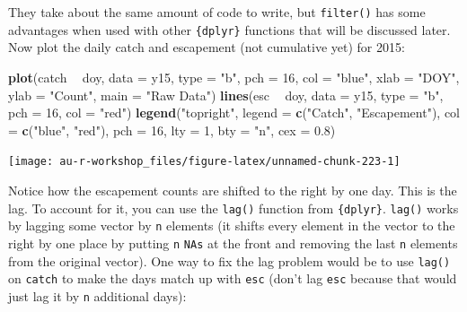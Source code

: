 \documentclass[]{book}
\newenvironment{Shaded}{\begin{snugshade}}{\end{snugshade}}
\newcommand{\KeywordTok}[1]{\textcolor[rgb]{0.13,0.29,0.53}{\textbf{#1}}}
\newcommand{\DataTypeTok}[1]{\textcolor[rgb]{0.13,0.29,0.53}{#1}}
\newcommand{\DecValTok}[1]{\textcolor[rgb]{0.00,0.00,0.81}{#1}}
\newcommand{\FloatTok}[1]{\textcolor[rgb]{0.00,0.00,0.81}{#1}}
\newcommand{\StringTok}[1]{\textcolor[rgb]{0.31,0.60,0.02}{#1}}
\newcommand{\OperatorTok}[1]{\textcolor[rgb]{0.81,0.36,0.00}{\textbf{#1}}}
\newcommand{\NormalTok}[1]{#1}
\theoremstyle{definition}
\theoremstyle{definition}
\theoremstyle{definition}
\theoremstyle{remark}
\begin{document}
They take about the same amount of code to write, but \texttt{filter()}
has some advantages when used with other \texttt{\{dplyr\}} functions
that will be discussed later. Now plot the daily catch and escapement
(not cumulative yet) for 2015:

\begin{Shaded}
\begin{Highlighting}[]
\KeywordTok{plot}\NormalTok{(catch }\OperatorTok{~}\StringTok{ }\NormalTok{doy, }\DataTypeTok{data =}\NormalTok{ y15, }\DataTypeTok{type =} \StringTok{"b"}\NormalTok{, }\DataTypeTok{pch =} \DecValTok{16}\NormalTok{, }\DataTypeTok{col =} \StringTok{"blue"}\NormalTok{,}
     \DataTypeTok{xlab =} \StringTok{"DOY"}\NormalTok{, }\DataTypeTok{ylab =} \StringTok{"Count"}\NormalTok{, }\DataTypeTok{main =} \StringTok{"Raw Data"}\NormalTok{)}
\KeywordTok{lines}\NormalTok{(esc }\OperatorTok{~}\StringTok{ }\NormalTok{doy, }\DataTypeTok{data =}\NormalTok{ y15, }\DataTypeTok{type =} \StringTok{"b"}\NormalTok{, }\DataTypeTok{pch =} \DecValTok{16}\NormalTok{, }\DataTypeTok{col =} \StringTok{"red"}\NormalTok{)}
\KeywordTok{legend}\NormalTok{(}\StringTok{"topright"}\NormalTok{, }\DataTypeTok{legend =} \KeywordTok{c}\NormalTok{(}\StringTok{"Catch"}\NormalTok{, }\StringTok{"Escapement"}\NormalTok{), }
       \DataTypeTok{col =} \KeywordTok{c}\NormalTok{(}\StringTok{"blue"}\NormalTok{, }\StringTok{"red"}\NormalTok{), }\DataTypeTok{pch =} \DecValTok{16}\NormalTok{, }\DataTypeTok{lty =} \DecValTok{1}\NormalTok{, }\DataTypeTok{bty =} \StringTok{"n"}\NormalTok{, }\DataTypeTok{cex =} \FloatTok{0.8}\NormalTok{)}
\end{Highlighting}
\end{Shaded}

\begin{center}\texttt{[image: au-r-workshop\_files/figure-latex/unnamed-chunk-223-1]} \end{center}

Notice how the escapement counts are shifted to the right by one day.
This is the lag. To account for it, you can use the \texttt{lag()}
function from \texttt{\{dplyr\}}. \texttt{lag()} works by lagging some
vector by \texttt{n} elements (it shifts every element in the vector to
the right by one place by putting \texttt{n} \texttt{NAs} at the front
and removing the last \texttt{n} elements from the original vector). One
way to fix the lag problem would be to use \texttt{lag()} on
\texttt{catch} to make the days match up with \texttt{esc} (don't lag
\texttt{esc} because that would just lag it by \texttt{n} additional
days):
\end{document}
